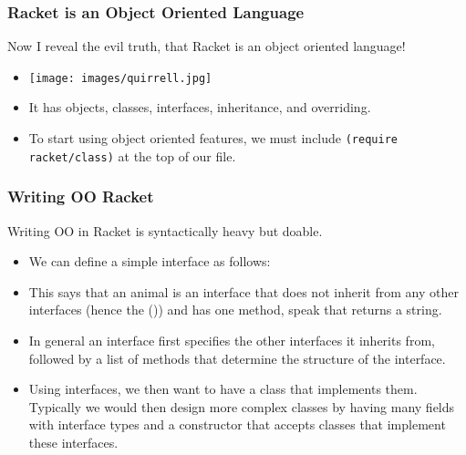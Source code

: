 \documentclass{beamer}
\begin{document}

\begin{frame}
  \frametitle{Racket is an Object Oriented Language}
  Now I reveal the evil truth, that Racket is an object oriented language!
  \begin{itemize}
  \item<2-> \texttt{[image: images/quirrell.jpg]}
  \item<3-> It has objects, classes, interfaces, inheritance, and overriding.
  \item<4-> To start using object oriented features, we must include
    \texttt{(require racket/class)} at the top of our file.  
  \end{itemize}
\end{frame}

\begin{frame}
  \frametitle{Writing OO Racket}
  Writing OO in Racket is syntactically heavy but doable. 
  \begin{itemize}
  \item<2-> We can define a simple interface as follows:
    \racketInterface
  \item<3-> This says that an animal is an interface that does not inherit
    from any other interfaces (hence the ()) and has one method, speak
    that returns a string.
  \item<4-> In general an interface first specifies the other interfaces it
    inherits from, followed by a list of methods that determine the structure
    of the interface.
  \item<5-> Using interfaces, we then want to have a class that implements them.
    Typically we would then design more complex classes by having many fields
    with interface types and a constructor that accepts classes that implement
    these interfaces.
  \end{itemize}
\end{frame}

\end{document}
